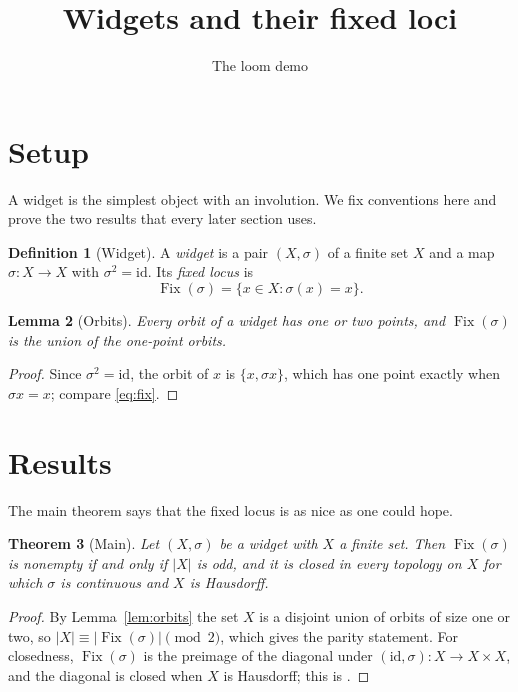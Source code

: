 \documentclass{amsart}
\title{Widgets and their fixed loci}
\author{The loom demo}
\providecommand{\uses}[1]{}
\theoremstyle{plain}
\newtheorem{theorem}{Theorem}[section]
\newtheorem{lemma}[theorem]{Lemma}
\theoremstyle{definition}
\newtheorem{definition}[theorem]{Definition}
\theoremstyle{remark}
\newcommand{\Fix}{\operatorname{Fix}}
\begin{document}
\maketitle

\section{Setup}\label{dm-0010}

A widget is the simplest object with an involution. We fix conventions here and prove the two results that every later section uses.


\begin{definition}[Widget]\label{dm-0001}\label{def:widget}
A \emph{widget} is a pair $(X,\sigma)$ of a finite set $X$ and a map $\sigma\colon X\to X$ with $\sigma^2=\mathrm{id}$. Its \emph{fixed locus} is
\begin{equation}\label{eq:fix}
\Fix(\sigma) = \{x\in X : \sigma(x) = x\}.
\end{equation}
\end{definition}



\begin{lemma}[Orbits]\label{dm-0002}\label{lem:orbits}
Every orbit of a widget has one or two points, and $\Fix(\sigma)$ is the union of the one-point orbits.
\end{lemma}
\begin{proof}
Since $\sigma^2=\mathrm{id}$, the orbit of $x$ is $\{x,\sigma x\}$, which has one point exactly when $\sigma x = x$; compare \eqref{eq:fix}.
\end{proof}


\section{Results}\label{dm-0011}

The main theorem says that the fixed locus is as nice as one could hope.


\begin{theorem}[Main]\label{dm-0003}
Let $(X,\sigma)$ be a widget with $X$ a finite set. Then $\Fix(\sigma)$ is nonempty if and only if $|X|$ is odd, and it is closed in every topology on $X$ for which $\sigma$ is continuous and $X$ is Hausdorff.
\end{theorem}
\begin{proof}
\uses{dm-0002}
By Lemma~\ref{lem:orbits} the set $X$ is a disjoint union of orbits of size one or two, so $|X| \equiv |\Fix(\sigma)| \pmod 2$, which gives the parity statement. For closedness, $\Fix(\sigma)$ is the preimage of the diagonal under $(\mathrm{id},\sigma)\colon X\to X\times X$, and the diagonal is closed when $X$ is Hausdorff; this is \cite[Proposition 3.2]{Calloway14}.
\end{proof}
\end{document}
